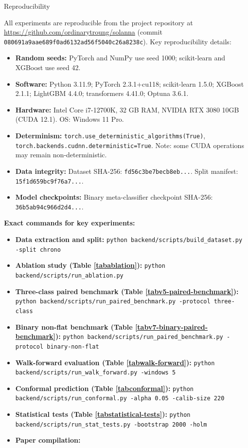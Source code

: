\documentclass[runningheads]{llncs}
\begin{document}
Reproducibility
\label{secreproducibility}

All experiments are reproducible from the project repository at
\url{https://github.com/ordinarytroung/solanna}
(commit \texttt{080691a9aae689f0ad6132ad56f5040c26a8238c}). Key reproducibility details:
\begin{itemize}
\item \textbf{Random seeds:} PyTorch and NumPy use seed 1000; scikit-learn and XGBoost use seed 42.
\item \textbf{Software:} Python 3.11.9; PyTorch 2.3.1+cu118; scikit-learn 1.5.0; XGBoost 2.1.1; LightGBM 4.4.0; transformers 4.41.0; Optuna 3.6.1.
\item \textbf{Hardware:} Intel Core i7-12700K, 32 GB RAM, NVIDIA RTX 3080 10GB (CUDA 12.1). OS: Windows 11 Pro.
\item \textbf{Determinism:} \texttt{torch.use\_deterministic\_algorithms(True)}, \texttt{torch.backends.cudnn.deterministic=True}. Note: some CUDA operations may remain non-deterministic.
\item \textbf{Data integrity:} Dataset SHA-256: \texttt{fd56c3be7becb8eb...}. Split manifest: \texttt{15f1d659bc9f76a7...}.
\item \textbf{Model checkpoints:} Binary meta-classifier checkpoint SHA-256: \texttt{36b5ab94c966d2d4...}.
\end{itemize}

\textbf{Exact commands for key experiments:}
\begin{itemize}
\item \textbf{Data extraction and split:} \texttt{python backend/scripts/build\_dataset.py -split chrono}
\item \textbf{Ablation study (Table \ref{tabablation}):} \texttt{python backend/scripts/run\_ablation.py}
\item \textbf{Three-class paired benchmark (Table \ref{tabv5-paired-benchmark}):} \texttt{python backend/scripts/run\_paired\_benchmark.py -protocol three-class}
\item \textbf{Binary non-flat benchmark (Table \ref{tabv7-binary-paired-benchmark}):} \texttt{python backend/scripts/run\_paired\_benchmark.py -protocol binary-non-flat}
\item \textbf{Walk-forward evaluation (Table \ref{tabwalk-forward}):} \texttt{python backend/scripts/run\_walk\_forward.py -windows 5}
\item \textbf{Conformal prediction (Table \ref{tabconformal}):} \texttt{python backend/scripts/run\_conformal.py -alpha 0.05 -calib-size 220}
\item \textbf{Statistical tests (Table \ref{tabstatistical-tests}):} \texttt{python backend/scripts/run\_stat\_tests.py -bootstrap 2000 -holm}
\item \textbf{Paper compilation:}
\end{itemize}
\end{document}
